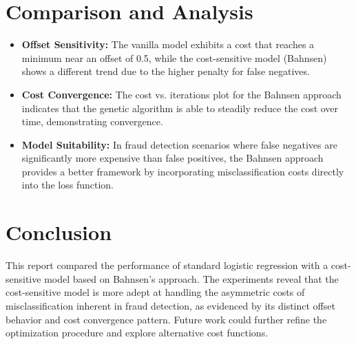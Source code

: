 \documentclass[11pt]{article}
\begin{document}
\section{Comparison and Analysis}
\begin{itemize}
    \item \textbf{Offset Sensitivity:} The vanilla model exhibits a cost that reaches a minimum near an offset of 0.5, while the cost-sensitive model (Bahnsen) shows a different trend due to the higher penalty for false negatives.
    \item \textbf{Cost Convergence:} The cost vs. iterations plot for the Bahnsen approach indicates that the genetic algorithm is able to steadily reduce the cost over time, demonstrating convergence.
    \item \textbf{Model Suitability:} In fraud detection scenarios where false negatives are significantly more expensive than false positives, the Bahnsen approach provides a better framework by incorporating misclassification costs directly into the loss function.
\end{itemize}

\section{Conclusion}
This report compared the performance of standard logistic regression with a cost-sensitive model based on Bahnsen's approach. The experiments reveal that the cost-sensitive model is more adept at handling the asymmetric costs of misclassification inherent in fraud detection, as evidenced by its distinct offset behavior and cost convergence pattern. Future work could further refine the optimization procedure and explore alternative cost functions.
\end{document}

